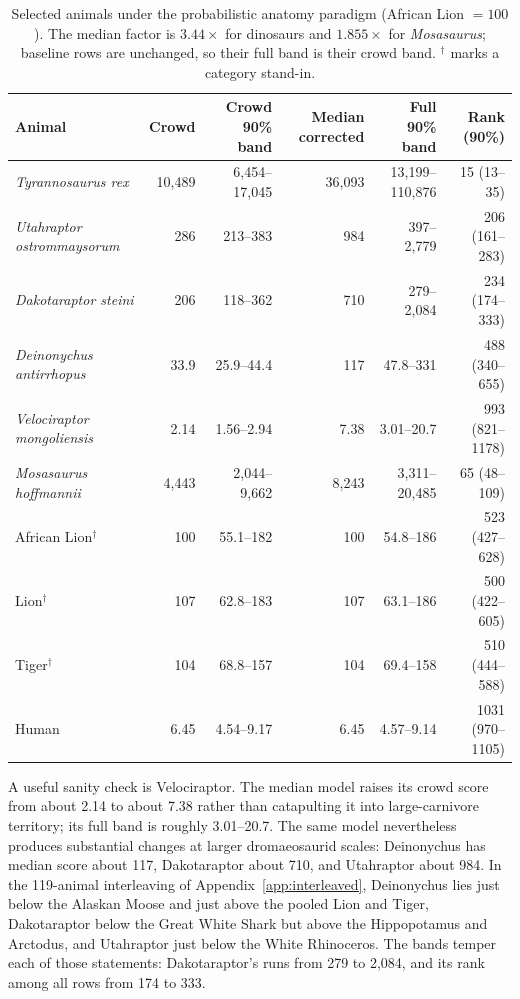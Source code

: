 \documentclass[11pt]{article}
\begin{document}
\begin{table}[H]
\centering
\footnotesize
\setlength{\tabcolsep}{4pt}
\begin{tabular}{lrrrrr}
\toprule
Animal & Crowd & Crowd 90\% band & Median corrected & Full 90\% band & Rank (90\%) \\
\midrule
\textit{Tyrannosaurus rex} & 10,489 & 6,454--17,045 & 36,093 & 13,199--110,876 & 15 (13--35) \\
\textit{Utahraptor ostrommaysorum} & 286 & 213--383 & 984 & 397--2,779 & 206 (161--283) \\
\textit{Dakotaraptor steini} & 206 & 118--362 & 710 & 279--2,084 & 234 (174--333) \\
\textit{Deinonychus antirrhopus} & 33.9 & 25.9--44.4 & 117 & 47.8--331 & 488 (340--655) \\
\textit{Velociraptor mongoliensis} & 2.14 & 1.56--2.94 & 7.38 & 3.01--20.7 & 993 (821--1178) \\
\textit{Mosasaurus hoffmannii} & 4,443 & 2,044--9,662 & 8,243 & 3,311--20,485 & 65 (48--109) \\
African Lion$^{\dagger}$ & 100 & 55.1--182 & 100 & 54.8--186 & 523 (427--628) \\
Lion$^{\dagger}$ & 107 & 62.8--183 & 107 & 63.1--186 & 500 (422--605) \\
Tiger$^{\dagger}$ & 104 & 68.8--157 & 104 & 69.4--158 & 510 (444--588) \\
Human & 6.45 & 4.54--9.17 & 6.45 & 4.57--9.14 & 1031 (970--1105) \\
\bottomrule
\end{tabular}
\caption{Selected animals under the probabilistic anatomy paradigm (African Lion $=100$). The median factor is $3.44\times$ for dinosaurs and $1.855\times$ for \textit{Mosasaurus}; baseline rows are unchanged, so their full band is their crowd band. $^{\dagger}$ marks a category stand-in.}
\label{tab:rescaled}
\end{table}

A useful sanity check is Velociraptor. The median model raises its crowd score from about 2.14 to about 7.38 rather than catapulting it into large-carnivore territory; its full band is roughly 3.01--20.7. The same model nevertheless produces substantial changes at larger dromaeosaurid scales: Deinonychus has median score about 117, Dakotaraptor about 710, and Utahraptor about 984. In the 119-animal interleaving of Appendix~\ref{app:interleaved}, Deinonychus lies just below the Alaskan Moose and just above the pooled Lion and Tiger, Dakotaraptor below the Great White Shark but above the Hippopotamus and Arctodus, and Utahraptor just below the White Rhinoceros. The bands temper each of those statements: Dakotaraptor's runs from 279 to 2,084, and its rank among all rows from 174 to 333.
\end{document}

